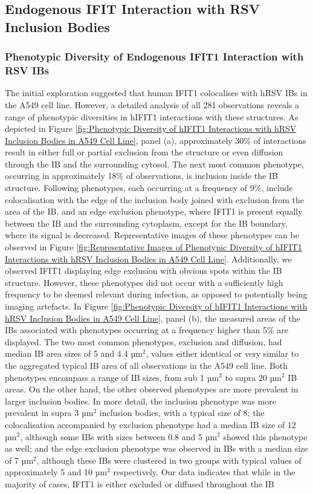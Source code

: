 \subsection{Endogenous IFIT Interaction with RSV Inclusion Bodies} \label{subsec:Endogenous IFIT Interaction with RSV Inclusion Bodies}
\subsubsection{Phenotypic Diversity of Endogenous IFIT1 Interaction with RSV IBs}
The initial exploration suggested that human IFIT1 colocalises with hRSV IBs in the A549 cell line. However, a detailed analysis of all 281 observations reveals a range of phenotypic diversities in hIFIT1 interactions with these structures. As depicted in Figure \ref{fig:Phenotypic Diversity of hIFIT1 Interactions with hRSV Inclusion Bodies in A549 Cell Line}, panel (a), approximately 30\% of interactions result in either full or partial exclusion from the structure or even diffusion through the IB and the surrounding cytosol. The next most common phenotype, occurring in approximately 18\% of observations, is inclusion inside the IB structure. Following phenotypes, each occurring at a frequency of 9\%, include colocalisation with the edge of the inclusion body joined with exclusion from the area of the IB, and an edge exclusion phenotype, where IFIT1 is present equally between the IB and the surrounding cytoplasm, except for the IB boundary, where its signal is decreased. Representative images of these phenotypes can be observed in Figure \ref{fig:Representative Images of Phenotypic Diversity of hIFIT1 Interactions with hRSV Inclusion Bodies in A549 Cell Line}. Additionally, we observed IFIT1 displaying edge exclusion with obvious spots within the IB structure. However, these phenotypes did not occur with a sufficiently high frequency to be deemed relevant during infection, as opposed to potentially being imaging artefacts. In Figure \ref{fig:Phenotypic Diversity of hIFIT1 Interactions with hRSV Inclusion Bodies in A549 Cell Line}, panel (b), the measured areas of the IBs associated with phenotypes occurring at a frequency higher than 5\% are displayed. The two most common phenotypes, exclusion and diffusion, had median IB area sizes of 5 and 4.4 \(\mbox{µm}^2\), values either identical or very similar to the aggregated typical IB area of all observations in the A549 cell line. Both phenotypes encompass a range of IB sizes, from sub 1 \(\mbox{µm}^2\) to supra 20 \(\mbox{µm}^2\) IB areas. On the other hand, the other observed phenotypes are more prevalent in larger inclusion bodies. In more detail, the inclusion phenotype was more prevalent in supra 3 \(\mbox{µm}^2\) inclusion bodies, with a typical size of 8; the colocalisation accompanied by exclusion phenotype had a median IB size of 12 \(\mbox{µm}^2\), although some IBs with sizes between 0.8 and 5 \(\mbox{µm}^2\) showed this phenotype as well; and the edge exclusion phenotype was observed in IBs with a median size of 7 \(\mbox{µm}^2\), although these IBs were clustered in two groups with typical values of approximately 5 and 10 \(\mbox{µm}^2\) respectively. Our data indicates that while in the majority of cases, IFIT1 is either excluded or diffused throughout the IB 